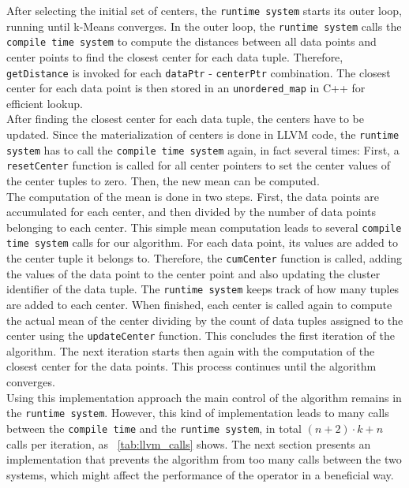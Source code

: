 After selecting the initial set of centers, the \texttt{runtime system} starts its outer loop, running until k-Means converges. In the outer loop, the \texttt{runtime system} calls the \texttt{compile time system} to compute the distances between all data points and center points to find the closest center for each data tuple. Therefore, \texttt{getDistance} is invoked for each \texttt{dataPtr} - \texttt{centerPtr} combination. The closest center for each data point is then stored in an \texttt{unordered\_map} in C++ for efficient lookup. 
\\
After finding the closest center for each data tuple, the centers have to be updated. Since the materialization of centers is done in LLVM code, the \texttt{runtime system} has to call the \texttt{compile time system} again, in fact several times: First, a \texttt{resetCenter} function is called for all center pointers to set the center values of the center tuples to zero. Then, the new mean can be computed. 
\\
The computation of the mean is done in two steps. First, the data points are accumulated for each center, and then divided by the number of data points belonging to each center. This simple mean computation leads to several \texttt{compile time system} calls for our algorithm. For each data point, its values are added to the center tuple it belongs to. Therefore, the \texttt{cumCenter} function is called, adding the values of the data point to the center point and also updating the cluster identifier of the data tuple. The \texttt{runtime system} keeps track of how many tuples are added to each center. When finished, each center is called again to compute the actual mean of the center dividing by the count of data tuples assigned to the center using the \texttt{updateCenter} function. This concludes the first iteration of the algorithm. The next iteration starts then again with the computation of the closest center for the data points. This process continues until the algorithm converges.
\\
Using this implementation approach the main control of the algorithm remains in the \texttt{runtime system}. However, this kind of implementation leads to many calls between the \texttt{compile time} and the \texttt{runtime system}, in total $(n+2) \cdot k + n$ calls per iteration, as ~\autoref{tab:llvm_calls} shows. The next section presents an implementation that prevents the algorithm from too many calls between the two systems, which might affect the performance of the operator in a beneficial way.




